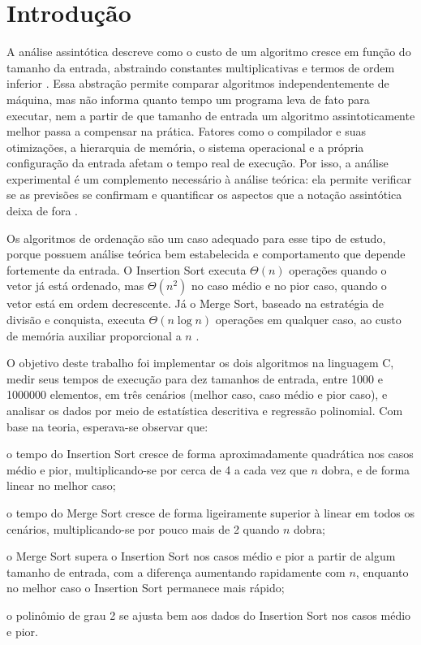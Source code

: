 \documentclass[
    12pt,
    oneside,
    a4paper,
    openany,
    chapter=TITLE,
    english,
    brazil
]{abntex2}
\begin{document}
\chapter{Introdução}
\label{cap:introducao}

A análise assintótica descreve como o custo de um algoritmo cresce em função do tamanho da entrada, abstraindo constantes multiplicativas e termos de ordem inferior \cite{cormen2012}. Essa abstração permite comparar algoritmos independentemente de máquina, mas não informa quanto tempo um programa leva de fato para executar, nem a partir de que tamanho de entrada um algoritmo assintoticamente melhor passa a compensar na prática. Fatores como o compilador e suas otimizações, a hierarquia de memória, o sistema operacional e a própria configuração da entrada afetam o tempo real de execução. Por isso, a análise experimental é um complemento necessário à análise teórica: ela permite verificar se as previsões se confirmam e quantificar os aspectos que a notação assintótica deixa de fora \cite{johnson2002,mcgeoch2012}.

Os algoritmos de ordenação são um caso adequado para esse tipo de estudo, porque possuem análise teórica bem estabelecida e comportamento que depende fortemente da entrada. O Insertion Sort executa $\Theta(n)$ operações quando o vetor já está ordenado, mas $\Theta(n^2)$ no caso médio e no pior caso, quando o vetor está em ordem decrescente. Já o Merge Sort, baseado na estratégia de divisão e conquista, executa $\Theta(n \log n)$ operações em qualquer caso, ao custo de memória auxiliar proporcional a $n$ \cite{cormen2012}.

O objetivo deste trabalho foi implementar os dois algoritmos na linguagem C, medir seus tempos de execução para dez tamanhos de entrada, entre \num{1000} e \num{1000000} elementos, em três cenários (melhor caso, caso médio e pior caso), e analisar os dados por meio de estatística descritiva e regressão polinomial. Com base na teoria, esperava-se observar que:

\begin{alineas}
    \item o tempo do Insertion Sort cresce de forma aproximadamente quadrática nos casos médio e pior, multiplicando-se por cerca de 4 a cada vez que $n$ dobra, e de forma linear no melhor caso;
    \item o tempo do Merge Sort cresce de forma ligeiramente superior à linear em todos os cenários, multiplicando-se por pouco mais de 2 quando $n$ dobra;
    \item o Merge Sort supera o Insertion Sort nos casos médio e pior a partir de algum tamanho de entrada, com a diferença aumentando rapidamente com $n$, enquanto no melhor caso o Insertion Sort permanece mais rápido;
    \item o polinômio de grau 2 se ajusta bem aos dados do Insertion Sort nos casos médio e pior.
\end{alineas}
\end{document}
